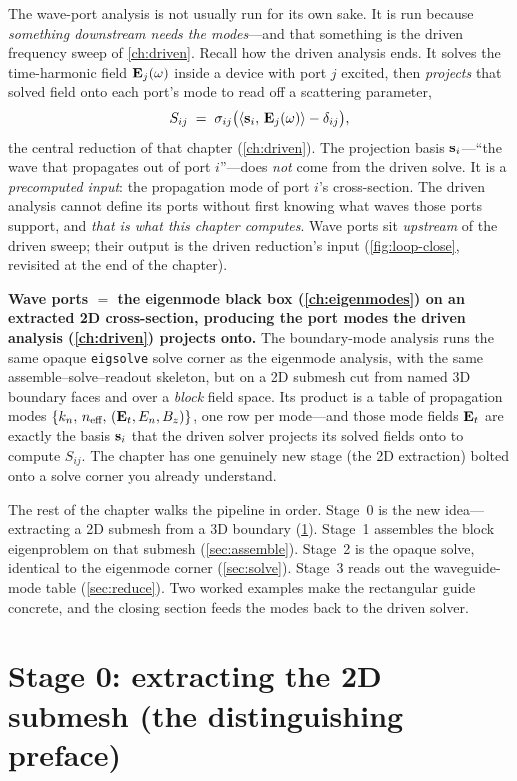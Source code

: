 The wave-port analysis is not usually run for its own sake. It is run because
\emph{something downstream needs the modes}---and that something is the driven
frequency sweep of \cref{ch:driven}. Recall how the driven analysis ends. It
solves the time-harmonic field $\mathbf{E}_j(\omega)$ inside a device with port $j$
excited, then \emph{projects} that solved field onto each port's mode to read off
a scattering parameter,
\[
  S_{ij} \;=\; \sigma_{ij}\bigl(\left\langle \mathbf{s}_i,\, \mathbf{E}_j(\omega)\right\rangle - \delta_{ij}\bigr),
\]
the central reduction of that chapter (\cref{ch:driven}). The projection basis
$\mathbf{s}_i$---``the wave that propagates out of port $i$''---does \emph{not} come from
the driven solve. It is a \emph{precomputed input}: the propagation mode of port
$i$'s cross-section. The driven analysis cannot define its ports without first
knowing what waves those ports support, and \emph{that is what this chapter
computes}. Wave ports sit \emph{upstream} of the driven sweep; their output is the
driven reduction's input (\cref{fig:loop-close}, revisited at the end of the
chapter).

\begin{keyidea}
\textbf{Wave ports $=$ the eigenmode black box (\cref{ch:eigenmodes}) on an
extracted 2D cross-section, producing the port modes the driven analysis
(\cref{ch:driven}) projects onto.} The boundary-mode analysis runs the same opaque
\texttt{eigsolve} solve corner as the eigenmode analysis, with the same
assemble--solve--readout skeleton, but on a 2D submesh cut from named 3D boundary
faces and over a \emph{block} field space. Its product is a table of propagation
modes $\{k_n,\,n_\text{eff},\,(\mathbf{E}_t,E_n,B_z)\}$, one row per mode---and those mode
fields $\mathbf{E}_t$ are exactly the basis $\mathbf{s}_i$ that the driven solver projects its
solved fields onto to compute $S_{ij}$. The chapter has one genuinely new stage
(the 2D extraction) bolted onto a solve corner you already understand.
\end{keyidea}

The rest of the chapter walks the pipeline in order. Stage~0 is the new
idea---extracting a 2D submesh from a 3D boundary (\cref{sec:extract}). Stage~1
assembles the block eigenproblem on that submesh (\cref{sec:assemble}). Stage~2 is
the opaque solve, identical to the eigenmode corner (\cref{sec:solve}). Stage~3
reads out the waveguide-mode table (\cref{sec:reduce}). Two worked examples make
the rectangular guide concrete, and the closing section feeds the modes back to
the driven solver.

\section{Stage 0: extracting the 2D submesh (the distinguishing preface)}
\label{sec:extract}

